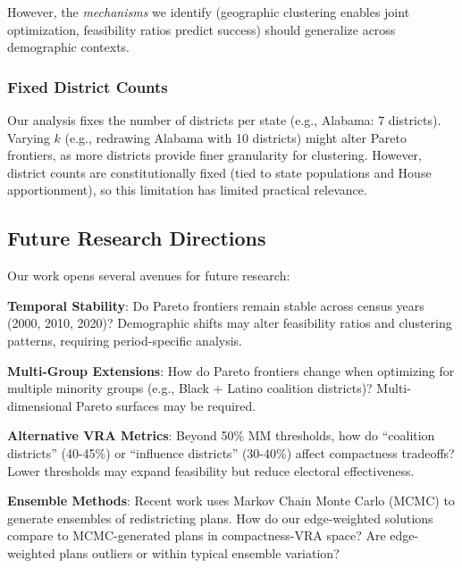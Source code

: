 However, the \emph{mechanisms} we identify (geographic clustering enables joint optimization, feasibility ratios predict success) should generalize across demographic contexts.

\subsubsection{Fixed District Counts}

Our analysis fixes the number of districts per state (e.g., Alabama: 7 districts). Varying $k$ (e.g., redrawing Alabama with 10 districts) might alter Pareto frontiers, as more districts provide finer granularity for clustering. However, district counts are constitutionally fixed (tied to state populations and House apportionment), so this limitation has limited practical relevance.

\subsection{Future Research Directions}

Our work opens several avenues for future research:

\textbf{Temporal Stability}: Do Pareto frontiers remain stable across census years (2000, 2010, 2020)? Demographic shifts may alter feasibility ratios and clustering patterns, requiring period-specific analysis.

\textbf{Multi-Group Extensions}: How do Pareto frontiers change when optimizing for multiple minority groups (e.g., Black + Latino coalition districts)? Multi-dimensional Pareto surfaces may be required.

\textbf{Alternative VRA Metrics}: Beyond 50\% MM thresholds, how do ``coalition districts'' (40-45\%) or ``influence districts'' (30-40\%) affect compactness tradeoffs? Lower thresholds may expand feasibility but reduce electoral effectiveness.

\textbf{Ensemble Methods}: Recent work uses Markov Chain Monte Carlo (MCMC) to generate ensembles of redistricting plans. How do our edge-weighted solutions compare to MCMC-generated plans in compactness-VRA space? Are edge-weighted plans outliers or within typical ensemble variation?
